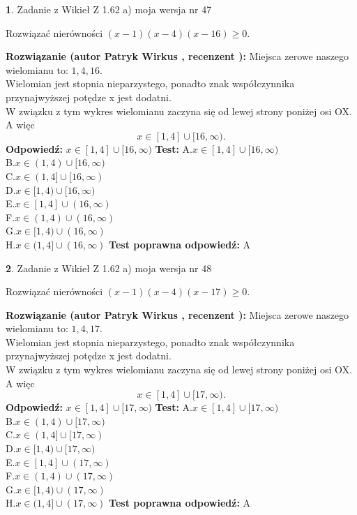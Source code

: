 \documentclass[12pt, a4paper]{article}
\theoremstyle{definition} %
\newtheorem{zad}{}
\newcommand{\zadStart}[1]{\begin{zad}#1\newline}
\newcommand{\zadStop}{\end{zad}}
\newcommand{\rozwStart}[2]{\noindent \textbf{Rozwiązanie (autor #1 , recenzent #2): }\newline}
\newcommand{\rozwStop}{\newline}
\newcommand{\odpStart}{\noindent \textbf{Odpowiedź:}\newline}
\newcommand{\odpStop}{\newline}
\newcommand{\testStart}{\noindent \textbf{Test:}\newline}
\newcommand{\testStop}{\newline}
\newcommand{\kluczStart}{\noindent \textbf{Test poprawna odpowiedź:}\newline}
\newcommand{\kluczStop}{\newline}
\begin{document}
\zadStart{Zadanie z Wikieł Z 1.62 a) moja wersja nr 47}

Rozwiązać nierówności $(x-1)(x-4)(x-16)\ge0$.
\zadStop
\rozwStart{Patryk Wirkus}{}
Miejsca zerowe naszego wielomianu to: $1, 4, 16$.\\
Wielomian jest stopnia nieparzystego, ponadto znak współczynnika przy\linebreak najwyższej potędze x jest dodatni.\\ W związku z tym wykres wielomianu zaczyna się od lewej strony poniżej osi OX. A więc $$x \in [1,4] \cup [16,\infty).$$
\rozwStop
\odpStart
$x \in [1,4] \cup [16,\infty)$
\odpStop
\testStart
A.$x \in [1,4] \cup [16,\infty)$\\
B.$x \in (1,4) \cup [16,\infty)$\\
C.$x \in (1,4] \cup [16,\infty)$\\
D.$x \in [1,4) \cup [16,\infty)$\\
E.$x \in [1,4] \cup (16,\infty)$\\
F.$x \in (1,4) \cup (16,\infty)$\\
G.$x \in [1,4) \cup (16,\infty)$\\
H.$x \in (1,4] \cup (16,\infty)$
\testStop
\kluczStart
A
\kluczStop



\zadStart{Zadanie z Wikieł Z 1.62 a) moja wersja nr 48}

Rozwiązać nierówności $(x-1)(x-4)(x-17)\ge0$.
\zadStop
\rozwStart{Patryk Wirkus}{}
Miejsca zerowe naszego wielomianu to: $1, 4, 17$.\\
Wielomian jest stopnia nieparzystego, ponadto znak współczynnika przy\linebreak najwyższej potędze x jest dodatni.\\ W związku z tym wykres wielomianu zaczyna się od lewej strony poniżej osi OX. A więc $$x \in [1,4] \cup [17,\infty).$$
\rozwStop
\odpStart
$x \in [1,4] \cup [17,\infty)$
\odpStop
\testStart
A.$x \in [1,4] \cup [17,\infty)$\\
B.$x \in (1,4) \cup [17,\infty)$\\
C.$x \in (1,4] \cup [17,\infty)$\\
D.$x \in [1,4) \cup [17,\infty)$\\
E.$x \in [1,4] \cup (17,\infty)$\\
F.$x \in (1,4) \cup (17,\infty)$\\
G.$x \in [1,4) \cup (17,\infty)$\\
H.$x \in (1,4] \cup (17,\infty)$
\testStop
\kluczStart
A
\kluczStop
\end{document}
